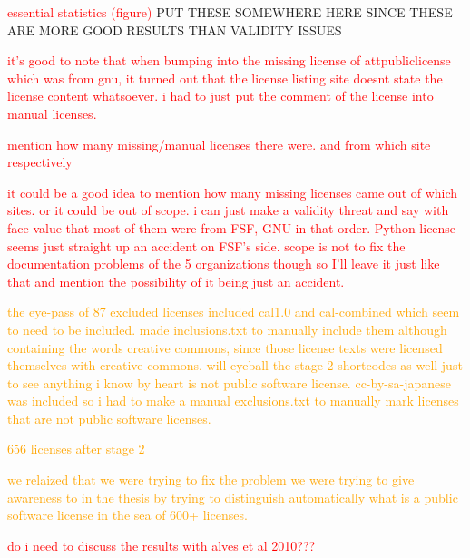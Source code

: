 \textcolor{red}{essential statistics (figure)}
PUT THESE SOMEWHERE HERE SINCE THESE ARE MORE GOOD RESULTS THAN VALIDITY ISSUES 

\textcolor{red}{it's good to note that when bumping into the missing license of attpubliclicense which was from gnu, it turned out that the license listing site doesnt state the license content whatsoever. i had to just put the comment of the license into manual licenses.}

\textcolor{red}{mention how many missing/manual licenses there were. and from which site respectively}

\textcolor{red}{it could be a good idea to mention how many missing licenses came out of which sites. or it could be out of scope. i can just make a validity threat and say with face value that most of them were from FSF, GNU in that order. Python license seems just straight up an accident on FSF's side. scope is not to fix the documentation problems of the 5 organizations though so I'll leave it just like that and mention the possibility of it being just an accident.}

\textcolor{orange}{the eye-pass of 87 excluded licenses included cal1.0 and cal-combined which seem to need to be included. made inclusions.txt to manually include them although containing the words creative commons, since those license texts were licensed themselves with creative commons. will eyeball the stage-2 shortcodes as well just to see anything i know by heart is not public software license. cc-by-sa-japanese was included so i had to make a manual exclusions.txt to manually mark licenses that are not public software licenses.}

\textcolor{orange}{656 licenses after stage 2}


\textcolor{orange}{we relaized that we were trying to fix the problem we were trying to give awareness to in the thesis by trying to distinguish automatically what is a public software license in the sea of 600+ licenses.}

\textcolor{red}{do i need to discuss the results with alves et al 2010???}